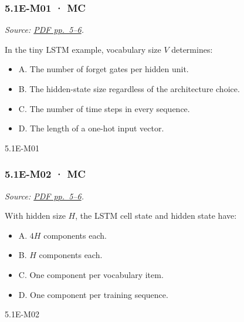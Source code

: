 \noindent\begin{minipage}{\linewidth}

\subsubsection{5.1E-M01 · MC}\label{e-m01-mc}

\emph{Source:
\href{../Lecture\%20Slides/5.1.\%20Extra\%20Material.pdf\#page=5}{PDF
pp.~5--6}.}

In the tiny LSTM example, vocabulary size \(V\) determines:

\begin{itemize}
\tightlist
\item
  A. The number of forget gates per hidden unit.
\item
  B. The hidden-state size regardless of the architecture choice.
\item
  C. The number of time steps in every sequence.
\item
  D. The length of a one-hot input vector.
\end{itemize}

\begin{solution}[8mm]{5.1E-M01}

\end{solution}
\end{minipage}\par\medskip

\noindent\begin{minipage}{\linewidth}

\subsubsection{5.1E-M02 · MC}\label{e-m02-mc}

\emph{Source:
\href{../Lecture\%20Slides/5.1.\%20Extra\%20Material.pdf\#page=5}{PDF
pp.~5--6}.}

With hidden size \(H\), the LSTM cell state and hidden state have:

\begin{itemize}
\tightlist
\item
  A. \(4H\) components each.
\item
  B. \(H\) components each.
\item
  C. One component per vocabulary item.
\item
  D. One component per training sequence.
\end{itemize}

\begin{solution}[8mm]{5.1E-M02}

\end{solution}
\end{minipage}\par\medskip

